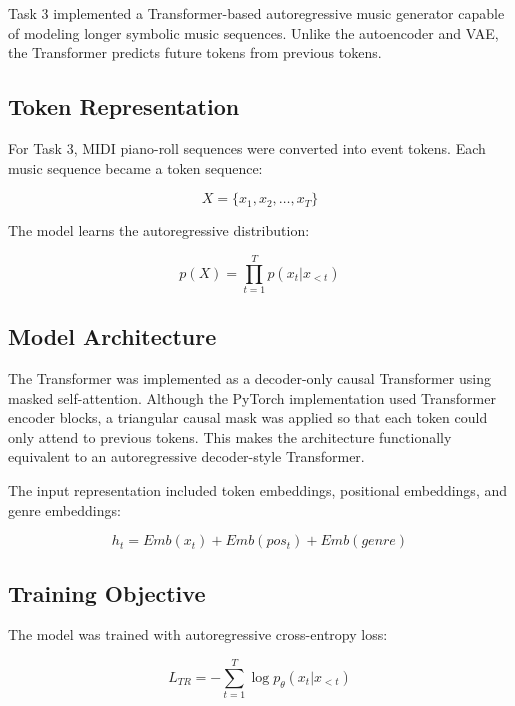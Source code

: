\documentclass[conference]{IEEEtran}
\begin{document}
Task 3 implemented a Transformer-based autoregressive music generator capable of modeling longer symbolic music sequences. Unlike the autoencoder and VAE, the Transformer predicts future tokens from previous tokens.

\subsection{Token Representation}

For Task 3, MIDI piano-roll sequences were converted into event tokens. Each music sequence became a token sequence:

\begin{equation}
X = \{x_1, x_2, \ldots, x_T\}
\end{equation}

The model learns the autoregressive distribution:

\begin{equation}
p(X) = \prod_{t=1}^{T} p(x_t | x_{<t})
\end{equation}

\subsection{Model Architecture}

The Transformer was implemented as a decoder-only causal Transformer using masked self-attention. Although the PyTorch implementation used Transformer encoder blocks, a triangular causal mask was applied so that each token could only attend to previous tokens. This makes the architecture functionally equivalent to an autoregressive decoder-style Transformer.

The input representation included token embeddings, positional embeddings, and genre embeddings:

\begin{equation}
h_t = Emb(x_t) + Emb(pos_t) + Emb(genre)
\end{equation}

\subsection{Training Objective}

The model was trained with autoregressive cross-entropy loss:

\begin{equation}
L_{TR} = -\sum_{t=1}^{T} \log p_{\theta}(x_t|x_{<t})
\end{equation}
\end{document}
